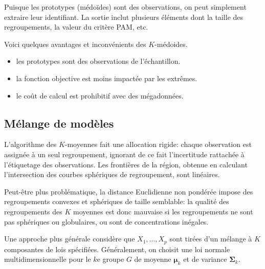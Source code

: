 \documentclass[
  11pt,
  letterpaper,
]{scrbook}
\newenvironment{Shaded}{\begin{snugshade}}{\end{snugshade}}
\newcommand{\CommentTok}[1]{\textcolor[rgb]{0.37,0.37,0.37}{#1}}
\newcommand{\DecValTok}[1]{\textcolor[rgb]{0.68,0.00,0.00}{#1}}
\newcommand{\NormalTok}[1]{\textcolor[rgb]{0.00,0.23,0.31}{#1}}
\newcommand{\OtherTok}[1]{\textcolor[rgb]{0.00,0.23,0.31}{#1}}
\newcommand{\SpecialCharTok}[1]{\textcolor[rgb]{0.37,0.37,0.37}{#1}}
\providecommand{\tightlist}{%
  \setlength{\itemsep}{0pt}\setlength{\parskip}{0pt}}\usepackage{longtable,booktabs,array}
\theoremstyle{definition}
\theoremstyle{remark}
\begin{document}
Puisque les prototypes (médoïdes) sont des observations, on peut
simplement extraire leur identifiant. La sortie inclut plusieurs
éléments dont la taille des regroupements, la valeur du critère PAM,
etc.

\begin{Shaded}
\end{Shaded}

Voici quelques avantages et inconvénients des \(K\)-médoides.

\begin{itemize}
\tightlist
\item
  les prototypes sont des observations de l'échantillon.
\item
  la fonction objective est moins impactée par les extrêmes.
\item
  le coût de calcul est prohibitif avec des mégadonnées.
\end{itemize}

\subsection{Mélange de modèles}\label{muxe9lange-de-moduxe8les}

L'algorithme des \(K\)-moyennes fait une allocation rigide: chaque
observation est assignée à un seul regroupement, ignorant de ce fait
l'incertitude rattachée à l'étiquetage des observations. Les frontières
de la région, obtenue en calculant l'intersection des courbes sphériques
de regroupement, sont linéaires.

Peut-être plus problématique, la distance Euclidienne non pondérée
impose des regroupements convexes et sphériques de taille semblable: la
qualité des regroupements des \(K\) moyennes est donc mauvaise si les
regroupements ne sont pas sphériques ou globulaires, ou sont de
concentrations inégales.

Une approche plus générale considère que \(X_1, \ldots, X_p\) sont
tirées d'un mélange à \(K\) composantes de lois spécifiées.
Généralement, on choisit une loi normale multidimensionnelle pour le
\(k\)e groupe \(G\) de moyenne \(\boldsymbol{\mu}_k\) et de variance
\(\boldsymbol{\Sigma}_k\).
\end{document}
